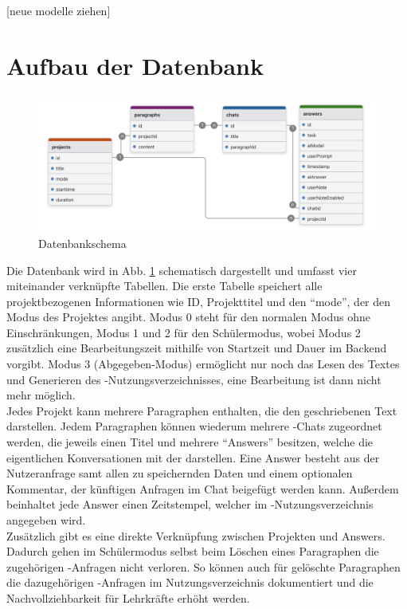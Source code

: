 \documentclass[../main.tex]{subfiles}
\begin{document}
[neue modelle ziehen]

\section{Aufbau der Datenbank}
\begin{figure}[h!]
  \includegraphics[scale=0.14]{bilder/Datenbank.png}
  \caption{Datenbankschema}
  \label{fig:data}
\end{figure}

Die Datenbank wird in Abb. \ref{fig:data} schematisch dargestellt und umfasst vier miteinander verknüpfte Tabellen. Die erste Tabelle speichert alle projektbezogenen Informationen wie ID, 
Projekttitel und den "`mode"', der den Modus des Projektes angibt. Modus 0 steht für den normalen Modus ohne Einschränkungen, Modus 1 und 2 für den Schülermodus, wobei Modus 2 zusätzlich 
eine Bearbeitungszeit mithilfe von Startzeit und Dauer im Backend vorgibt. Modus 3 (Abgegeben-Modus) ermöglicht nur noch das Lesen des Textes und Generieren des -Nutzungsverzeichnisses, 
eine Bearbeitung ist dann nicht mehr möglich.\\ Jedes Projekt kann mehrere Paragraphen enthalten, die den geschriebenen Text darstellen. Jedem Paragraphen können wiederum mehrere 
-Chats zugeordnet werden, die jeweils einen Titel und mehrere "`Answers"' besitzen, welche die eigentlichen Konversationen mit der  darstellen. Eine Answer besteht aus 
der Nutzeranfrage samt allen zu speichernden Daten und einem optionalen Kommentar, der künftigen Anfragen im Chat beigefügt werden kann. Außerdem beinhaltet jede Answer einen 
Zeitstempel, welcher im -Nutzungsverzeichnis angegeben wird.\\ Zusätzlich gibt es eine direkte Verknüpfung zwischen Projekten und Answers. Dadurch gehen im 
Schülermodus selbst beim Löschen eines Paragraphen die zugehörigen -Anfragen nicht verloren. So können auch für gelöschte Paragraphen die dazugehörigen -Anfragen 
im Nutzungsverzeichnis dokumentiert und die Nachvollziehbarkeit für Lehrkräfte erhöht werden.
\end{document}
